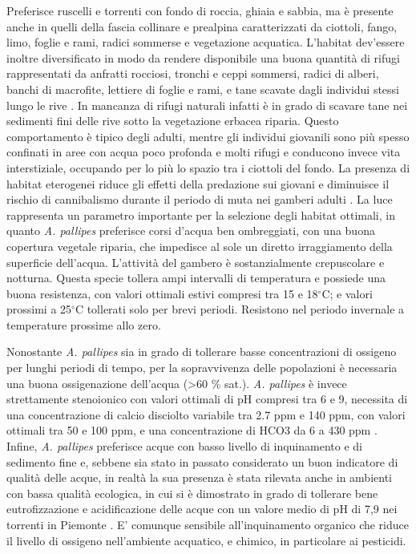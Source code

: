 \documentclass[11pt,a4paper,italian,twoside,openany]{memoir}
\begin{document}
Preferisce ruscelli e torrenti con fondo di roccia, ghiaia e sabbia, ma è presente anche in quelli della fascia collinare e prealpina caratterizzati da ciottoli, fango, limo, foglie e rami, radici sommerse e vegetazione acquatica. L'habitat dev'essere inoltre diversificato in modo da rendere disponibile una buona quantità di rifugi rappresentati da anfratti rocciosi, tronchi e ceppi sommersi, radici di alberi, banchi di macrofite, lettiere di foglie e rami, e tane scavate dagli individui stessi lungo le rive \cite{Souty-Grosset 2006}. In mancanza di rifugi naturali infatti è in grado di scavare tane nei sedimenti fini delle rive sotto la vegetazione erbacea riparia. Questo comportamento è tipico degli adulti, mentre gli individui giovanili sono più spesso confinati in aree con acqua poco profonda e molti rifugi e conducono invece vita interstiziale, occupando per lo più lo spazio tra i ciottoli del fondo. La presenza di habitat eterogenei riduce gli effetti della predazione sui giovani e diminuisce il rischio di cannibalismo durante il periodo di muta nei gamberi adulti \cite{Ackefors 1996}. 
La luce rappresenta un parametro importante per la selezione degli habitat ottimali, in quanto \emph{A. pallipes} preferisce corsi d'acqua ben ombreggiati, con una buona copertura vegetale riparia, che impedisce al sole un diretto irraggiamento della superficie dell'acqua. L'attività del gambero è sostanzialmente crepuscolare e notturna. Questa specie tollera ampi intervalli di temperatura e possiede una buona resistenza, con valori ottimali estivi compresi tra 15 e 18$^{\circ}$C; e valori prossimi a 25$^{\circ}$C tollerati solo per brevi periodi. Resistono nel periodo invernale a temperature prossime allo zero.

Nonostante \emph{A. pallipes} sia in grado di tollerare basse concentrazioni di ossigeno per lunghi periodi di tempo, per la sopravvivenza delle popolazioni è necessaria una buona ossigenazione dell'acqua (>60 \% sat.). \emph{A. pallipes} è invece strettamente stenoionico con valori ottimali di pH compresi tra 6 e 9, necessita di una concentrazione di calcio disciolto variabile tra 2.7 ppm e 140 ppm, con valori ottimali tra 50 e 100 ppm, e una concentrazione di HCO3 da 6 a 430 ppm \cite{Smith 1996}. Infine, \emph{A. pallipes} preferisce acque con basso livello di inquinamento e di sedimento fine e, sebbene sia stato in passato considerato un buon indicatore di qualità delle acque, in realtà la sua presenza è stata rilevata anche in ambienti con bassa qualità ecologica, in cui si è dimostrato in grado di tollerare bene eutrofizzazione e acidificazione delle acque con un valore medio di pH di 7,9 nei torrenti in Piemonte \cite{Favaro 2010}. E' comunque sensibile all'inquinamento organico che riduce il livello di ossigeno nell'ambiente acquatico, e chimico, in particolare ai pesticidi.
\end{document}
